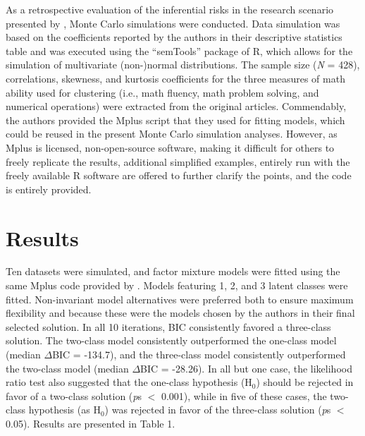 \documentclass[letterpaper,11pt]{article}
\begin{document}
As a retrospective evaluation of the inferential risks in the research scenario presented by , Monte Carlo simulations were conducted. Data simulation was based on the coefficients reported by the authors in their descriptive statistics table and was executed using the “semTools” package of R, which allows for the simulation of multivariate (non-)normal distributions. The sample size (\textit{N} = 428), correlations, skewness, and kurtosis coefficients for the three measures of math ability used for clustering (i.e., math fluency, math problem solving, and numerical operations) were extracted from the original articles. Commendably, the authors provided the Mplus script that they used for fitting models, which could be reused in the present Monte Carlo simulation analyses. However, as Mplus is licensed, non-open-source software, making it difficult for others to freely replicate the results, additional simplified examples, entirely run with the freely available R software \cite{team2010r} are offered to further clarify the points, and the code is entirely provided.

\section*{Results}

Ten datasets were simulated, and factor mixture models were fitted using the same Mplus code provided by . Models featuring 1, 2, and 3 latent classes were fitted. Non-invariant model alternatives were preferred both to ensure maximum flexibility and because these were the models chosen by the authors in their final selected solution. In all 10 iterations, BIC consistently favored a three-class solution. The two-class model consistently outperformed the one-class model (median $\Delta$BIC = -134.7), and the three-class model consistently outperformed the two-class model (median $\Delta$BIC = -28.26). In all but one case, the likelihood ratio test also suggested that the one-class hypothesis (H$_{0}$) should be rejected in favor of a two-class solution (\textit{p}s $<$ 0.001), while in five of these cases, the two-class hypothesis (as H$_{0}$) was rejected in favor of the three-class solution (\textit{p}s $<$ 0.05). Results are presented in Table 1.
\end{document}
